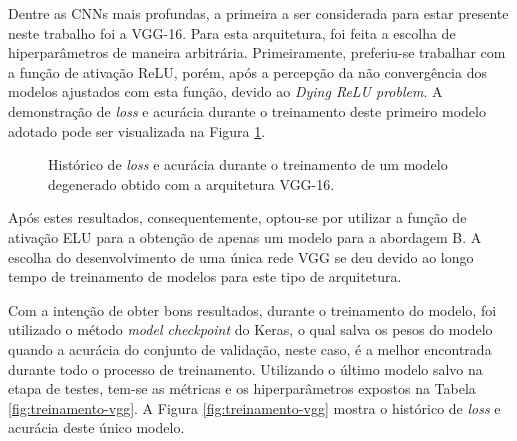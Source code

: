 Dentre as CNNs mais profundas, a primeira a ser considerada para estar presente neste trabalho foi a VGG-16. Para esta arquitetura, foi feita a escolha de hiperparâmetros de maneira arbitrária. Primeiramente, preferiu-se trabalhar com a função de ativação ReLU, porém, após a percepção da não convergência dos modelos ajustados com esta função, devido ao \emph{Dying ReLU problem}. A demonstração de \emph{loss} e acurácia durante o treinamento deste primeiro modelo adotado pode ser visualizada na Figura \ref{fig:vgg-dying-relu}.


\begin{figure}[H]
\centering
\caption{Histórico de \emph{loss} e acurácia durante o treinamento de um modelo degenerado obtido com a arquitetura VGG-16.}
\label{fig:vgg-dying-relu}
\hfill
{}
\end{figure}

Após estes resultados, consequentemente, optou-se por utilizar a função de ativação ELU para a obtenção de apenas um modelo para a abordagem B. A escolha do desenvolvimento de uma única rede VGG se deu devido ao longo tempo de treinamento de modelos para este tipo de arquitetura. 

Com a intenção de obter bons resultados, durante o treinamento do modelo, foi utilizado o método \emph{model checkpoint} do Keras, o qual salva os pesos do modelo quando a acurácia do conjunto de validação, neste caso, é a melhor encontrada durante todo o processo de treinamento. Utilizando o último modelo salvo na etapa de testes, tem-se as métricas e os hiperparâmetros expostos na Tabela \ref{fig:treinamento-vgg}. A Figura \ref{fig:treinamento-vgg} mostra o histórico de \emph{loss} e acurácia deste único modelo.

